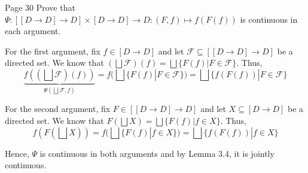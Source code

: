 \begin{problem}{Page 30}
    Prove that $ \Psi : [[D \to D] \to D] \times [D \to D] \to D : (F,f) \mapsto f(F(f)) $
is continuous in each argument.
\end{problem}

\begin{solution}
    For the first argument, fix $f \in [D \to D]$ and let $\mathcal{F} \subseteq [[D \to D] \to D]$ be a directed set.
We know that $(\bigsqcup \mathcal{F})(f) = \bigsqcup \{ F(f) | F \in \mathcal{F} \}$.
Thus, $$  \underbrace{f((\bigsqcup \mathcal{F})(f))}_{\Psi (\bigsqcup \mathcal{F} ,f)} = f(\bigsqcup \{ F(f) | F \in \mathcal{F} \}) = \bigsqcup \{ f(F(f)) | F \in \mathcal{F} \}  $$

For the second argument, fix $F \in [[D \to D] \to D]$ and let $X \subseteq [D \to D]$ be a directed set. We know that $F(\bigsqcup X) = \bigsqcup \{ F(f) | f \in X \}$. Thus,
$$  f(F(\bigsqcup X)) = f(\bigsqcup \{F(f) | f \in X\}) = \bigsqcup \{f(F(f)) | f \in X \}  $$

Hence, $\Psi$ is continuous in both arguments and by Lemma 3.4, it is jointly continuous.
\end{solution}